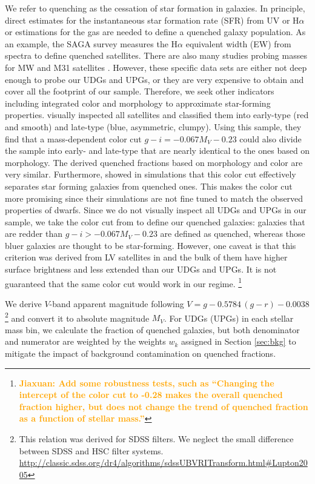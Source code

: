 \documentclass[twocolumn,astrosymb,twocolappendix]{aastex631}
\newcommand{\jiaxuan}[1]{\textcolor{orange}{\textbf{Jiaxuan: #1}}}
\begin{document}
\begin{CJK*}{UTF8}{gbsn}
We refer to quenching as the cessation of star formation in galaxies. In principle, direct estimates for the instantaneous star formation rate (SFR) from UV or H$\alpha$ or estimations for the  gas are needed to define a quenched galaxy  population. As an example, the SAGA survey measures the H$\alpha$ equivalent width (EW) from spectra to define quenched satellites. There are also many studies probing  masses for MW and M31 satellites \citep[e.g.,][]{Grcevich2009,Spekkens2014,Putman2021}. However, these specific data sets are either not deep enough to probe our UDGs and UPGs, or they are very expensive to obtain and cover all the footprint of our sample. Therefore, we seek other indicators including integrated color and morphology to approximate star-forming properties. \citet{CarlstenELVES2022} visually inspected all satellites and classified them into early-type (red and smooth) and late-type (blue, asymmetric, clumpy). Using this sample, they find that a mass-dependent color cut $g-i = -0.067 M_V - 0.23$ could also divide the sample into early- and late-type that are nearly identical to the ones based on morphology. The derived quenched fractions based on morphology and color are very similar. Furthermore, \citet{Font2022} showed in simulations that this color cut effectively separates star forming galaxies from quenched ones. This makes the color cut more promising since their simulations are not fine tuned to match the observed properties of dwarfs. Since we do not visually inspect all UDGs and UPGs in our sample, we take the color cut from \citet{CarlstenELVES2022} to define our quenched galaxies: galaxies that are redder than $g-i > -0.067 M_V - 0.23$ are defined as quenched, whereas those bluer galaxies are thought to be star-forming. However, one caveat is that this criterion was derived from LV satellites in \citet{CarlstenELVES2022} and the bulk of them have higher surface brightness and less extended than our UDGs and UPGs. It is not guaranteed that the same color cut would work in our regime. \footnote{\jiaxuan{Add some robustness tests, such as ``Changing the intercept of the color cut to -0.28 makes the overall quenched fraction higher, but does not change the trend of quenched fraction as a function of stellar mass.''}}

We derive $V$-band apparent magnitude following $V = g - 0.5784\, (g - r) - 0.0038$\footnote{This relation was derived for SDSS filters. We neglect the small difference between SDSS and HSC filter systems. \url{http://classic.sdss.org/dr4/algorithms/sdssUBVRITransform.html\#Lupton2005}} and convert it to absolute magnitude $M_V$. For UDGs (UPGs) in each stellar mass bin, we calculate the fraction of quenched galaxies, but both denominator and numerator are weighted by the weights $w_k$ assigned in Section \ref{sec:bkg} to mitigate the impact of background contamination on quenched fractions. 


\end{CJK*}
\end{document}
